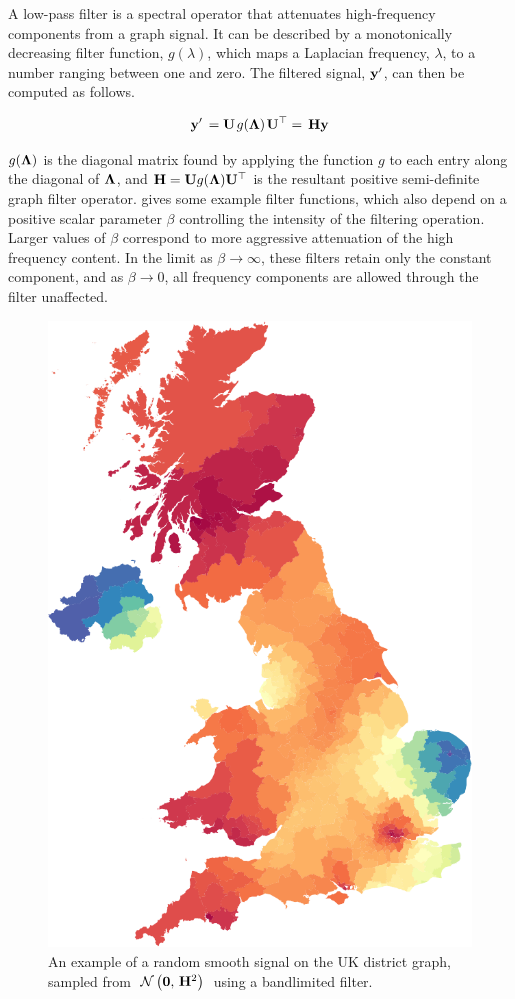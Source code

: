 A low-pass filter is a spectral operator that attenuates high-frequency components from a graph signal. It can be described by a monotonically decreasing filter function, $g(\lambda)$, which maps a Laplacian frequency, $\lambda$, to a number ranging between one and zero. The filtered signal, $\mathbf{y}'$, can then be computed as follows. \phantom{A low-pass filter is another matric}



\begin{equation}
    \mathbf{y}' \, =\mathbf{U} \mkern 2mu g(\mathbf{\Lambda}) \mkern 2mu \mathbf{U}^\top = \, \mathbf{H} \mathbf{y}
\end{equation}

$g(\mathbf{\Lambda})$ is the diagonal matrix found by applying the function $g$ to each entry along the diagonal of $\mathbf{\Lambda}$, and $\mathbf{H} = \mathbf{U} g(\mathbf{\Lambda}) \mathbf{U}^\top$ is the resultant positive semi-definite graph filter operator.  gives some example filter functions, which also depend on a positive scalar parameter $\beta$ controlling the intensity of the filtering operation. Larger values of $\beta$ correspond to more aggressive attenuation of the high frequency content. In the limit as $\beta \rightarrow \infty$, these filters retain only the constant component, and as $\beta \rightarrow 0$, all frequency components are allowed through the filter unaffected. 


\begin{figure}
	\centering
		\includegraphics[width=0.75\linewidth]{Figures/uk_smooth.pdf}
	\caption[An example of a random smooth graph signal]{An example of a random smooth signal on the UK district graph, sampled from $\; \mathcal{N}\left(\mathbf{0}, \, \mathbf{H}^2\right) \;$ using a bandlimited filter. }
	\label{fig:random_smooth_uk}
\end{figure}

